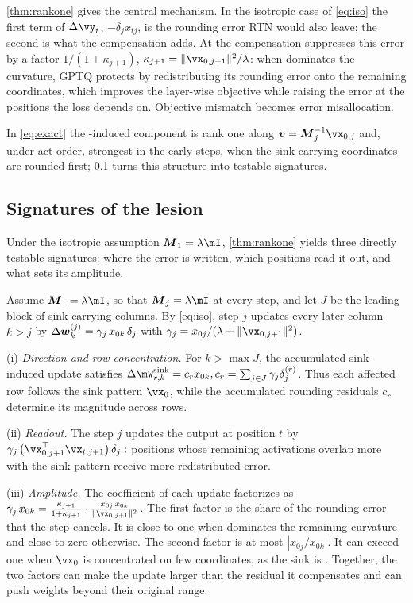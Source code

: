 \cref{thm:rankone} gives the central mechanism. In the isotropic case of \cref{eq:iso} the first term of $\Delta\vy_t$, $-\delta_jx_{tj}$, is the rounding error RTN would also leave; the second is what the compensation adds. At \bos{} the compensation suppresses this error by a factor $1/(1+\kappa_{j+1})$, $\kappa_{j+1}=\|\vx_{0,j+1}\|^2/\lambda$: when \bos{} dominates the curvature, GPTQ protects \bos{} by redistributing its rounding error onto the remaining coordinates, which improves the layer-wise objective while raising the error at the positions the loss depends on. Objective mismatch becomes error misallocation.

In \cref{eq:exact} the \bos{}-induced component is rank one along $\vv=\mM_j^{-1}\vx_{0,j}$ and, under act-order, strongest in the early steps, when the sink-carrying coordinates are rounded first; \cref{sec:mechanism:signatures} turns this structure into testable signatures.

\subsection{Signatures of the lesion}
\label{sec:mechanism:signatures}

Under the isotropic assumption $\mM_1=\lambda\mI$,  \cref{thm:rankone} yields three directly testable signatures: where the error is written, which positions read it out, and what sets its amplitude.

\begin{corollary}
\label{cor:shape}
Assume $\mM_1=\lambda\mI$, so that $\mM_j=\lambda\mI$ at every step, and let $J$ be the leading block of sink-carrying
columns.
By \cref{eq:iso}, step $j$ updates every later column $k>j$ by $\Delta\boldsymbol{w}^{(j)}_k=\gamma_j\,x_{0k}\,\delta_j$ with $\gamma_j=x_{0j}/(\lambda+\|\vx_{0,j+1}\|^2)$.

(i) \emph{Direction and row concentration.} 
For $k > \max J$, the accumulated sink-induced update satisfies $\Delta\mW^{\mathrm{sink}}_{r,k}=c_r x_{0k}, c_r=\sum_{j\in J}\gamma_j\delta_j^{(r)}$. Thus each affected row follows the sink pattern $\vx_0$, while the accumulated rounding residuals $c_r$ determine its magnitude across rows.

(ii) \emph{Readout.}
The step $j$ updates the output at position $t$ by
$
\gamma_j\,\big(\vx_{0,j+1}^\top\vx_{t,j+1}\big)\,\delta_j :
$
positions whose remaining activations overlap more with the sink pattern
receive more redistributed error.

(iii) \emph{Amplitude.}
The coefficient of each update factorizes as $\gamma_j\,x_{0k}=\frac{\kappa_{j+1}}{1+\kappa_{j+1}}\cdot\frac{x_{0j}\,x_{0k}}{\|\vx_{0,j+1}\|^2}$.
The first factor is the share of the \bos{} rounding error that the step cancels. It is close to one when \bos{} dominates the remaining curvature and close to zero otherwise.
The second factor is at most $|x_{0j}/x_{0k}|$. It can exceed one when $\vx_0$ is concentrated on few coordinates, as the sink is \citep{sun2024massive}.
Together, the two factors can make the update larger than the residual it compensates and can push weights beyond their original range.
\end{corollary}


